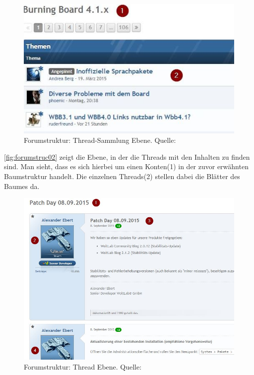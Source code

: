 \documentclass[a4paper]{article}
\begin{document}
	\begin{figure}[H] 
		\centerline{
			\includegraphics{../Bilder/forumstruc002.jpg}
		}
		\caption{Forumstruktur: Thread-Sammlung Ebene. Quelle: \cite{BB}}
		\label{fig:forumstruc002}
	\end{figure}	
	
	\autoref{fig:forumstruc02} zeigt die Ebene, in der die Threads mit den
	Inhalten zu finden sind. Man sieht, dass es sich hierbei um einen Konten(1)
	in der zuvor erwähnten Baumstruktur handelt. Die einzelnen Threads(2) stellen
	dabei die Blätter des Baumes da.
		
	\begin{figure}[H] 
		\centerline{
			\includegraphics[scale=0.6]{../Bilder/forumstruc003.jpg}
		}
		\caption{Forumstruktur: Thread Ebene. Quelle: \cite{BB}}
		\label{fig:forumstruc003}
	\end{figure}	
	
\end{document}
